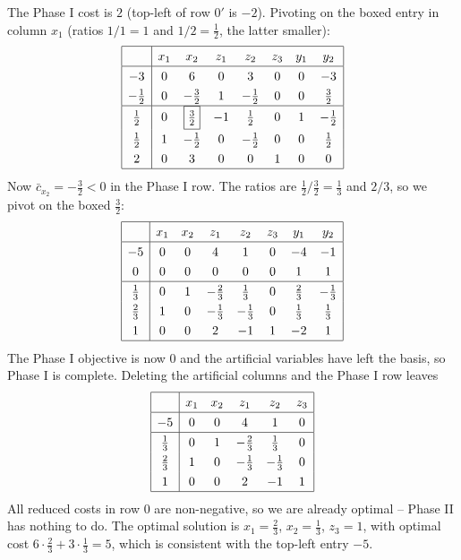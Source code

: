 \begin{example}
$$    $$
    The Phase I cost is $2$ (top-left of row $0'$ is $-2$). Pivoting on the boxed entry in column $x_1$ (ratios $1/1 = 1$ and $1/2 = \frac12$, the latter smaller):
    $$
    \arraycolsep=5pt\def\arraystretch{1.3}
    \begin{array}{|c|ccccccc|}\hline
        \multicolumn{1}{|c|}{} & x_1 & x_2 & z_1 & z_2 & z_3 & y_1 & y_2\\\hline
        -3 & 0 & 6 & 0 & 3 & 0 & 0 & -3\\
        -\frac12 & 0 & -\frac32 & 1 & -\frac12 & 0 & 0 & \frac32\\\hline
        \frac12 & 0 & \boxed{\tfrac32} & -1 & \frac12 & 0 & 1 & -\frac12\\
        \frac12 & 1 & -\frac12 & 0 & -\frac12 & 0 & 0 & \frac12\\
        2 & 0 & 3 & 0 & 0 & 1 & 0 & 0\\\hline
    \end{array}
    $$
    Now $\bar c_{x_2} = -\frac32 < 0$ in the Phase I row. The ratios are $\frac12 / \frac32 = \frac13$ and $2/3$, so we pivot on the boxed $\frac32$:
    $$
    \arraycolsep=5pt\def\arraystretch{1.3}
    \begin{array}{|c|ccccccc|}\hline
        \multicolumn{1}{|c|}{} & x_1 & x_2 & z_1 & z_2 & z_3 & y_1 & y_2\\\hline
        -5 & 0 & 0 & 4 & 1 & 0 & -4 & -1\\
        0 & 0 & 0 & 0 & 0 & 0 & 1 & 1\\\hline
        \frac13 & 0 & 1 & -\frac23 & \frac13 & 0 & \frac23 & -\frac13\\
        \frac23 & 1 & 0 & -\frac13 & -\frac13 & 0 & \frac13 & \frac13\\
        1 & 0 & 0 & 2 & -1 & 1 & -2 & 1\\\hline
    \end{array}
    $$
    The Phase I objective is now $0$ and the artificial variables have left the basis, so Phase I is complete. Deleting the artificial columns and the Phase I row leaves
    $$
    \arraycolsep=5pt\def\arraystretch{1.3}
    \begin{array}{|c|ccccc|}\hline
        \multicolumn{1}{|c|}{} & x_1 & x_2 & z_1 & z_2 & z_3\\\hline
        -5 & 0 & 0 & 4 & 1 & 0\\\hline
        \frac13 & 0 & 1 & -\frac23 & \frac13 & 0\\
        \frac23 & 1 & 0 & -\frac13 & -\frac13 & 0\\
        1 & 0 & 0 & 2 & -1 & 1\\\hline
    \end{array}
    $$
    All reduced costs in row $0$ are non-negative, so we are already optimal -- Phase II has nothing to do. The optimal solution is $x_1 = \frac23$, $x_2 = \frac13$, $z_3 = 1$, with optimal cost $6\cdot\frac23 + 3\cdot\frac13 = 5$, which is consistent with the top-left entry $-5$.
\end{example}

